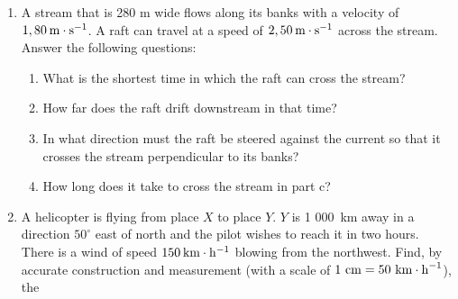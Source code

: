 \begin{enumerate}[noitemsep, label=\textbf{\arabic*}. ]
\label{m38819*uid123}\item A stream that is 280 m wide flows along its banks with a velocity of \begin{math}1,80\phantom{\rule{2pt}{0ex}}\mathrm{m}\ensuremath{\cdot}\mathrm{s}{}^{-1}\end{math}. A raft can travel at a speed of \begin{math}2,50\phantom{\rule{2pt}{0ex}}\mathrm{m}\ensuremath{\cdot}\mathrm{s}{}^{-1}\end{math} across the stream. Answer the following questions:
\label{m38819*id198337}\begin{enumerate}[noitemsep, label=\textbf{\alph*}. ] 
            \label{m38819*uid124}\item What is the shortest time in which the raft can cross the stream?
\label{m38819*uid125}\item How far does the raft drift downstream in that time?
\label{m38819*uid126}\item In what direction must the raft be steered against the current so that it crosses the stream perpendicular to its banks?
\label{m38819*uid127}\item How long does it take to cross the stream in part c?
\end{enumerate}
                \label{m38819*uid128}\item A helicopter is flying from place \begin{math}X\end{math} to place \begin{math}Y\end{math}. \begin{math}Y\end{math} is 1 000~km away in a direction \begin{math}{50}^{\circ }\end{math} east of north and the pilot wishes to reach it in two hours. There is a wind of speed \begin{math}150\phantom{\rule{2pt}{0ex}}\mathrm{km}\ensuremath{\cdot}\mathrm{h}{}^{-1}\end{math} blowing from the northwest. Find, by accurate construction and measurement (with a scale of \begin{math}1\phantom{\rule{3.33333pt}{0ex}}\mathrm{cm}=50\phantom{\rule{3.33333pt}{0ex}}{\mathrm{km}\ensuremath{\cdot}\mathrm{h}}^{-1}\end{math}), the
\label{m38819*id198505}\begin{enumerate}[noitemsep, label=\textbf{\alph*}. ] 

\end{enumerate}
\end{enumerate}
